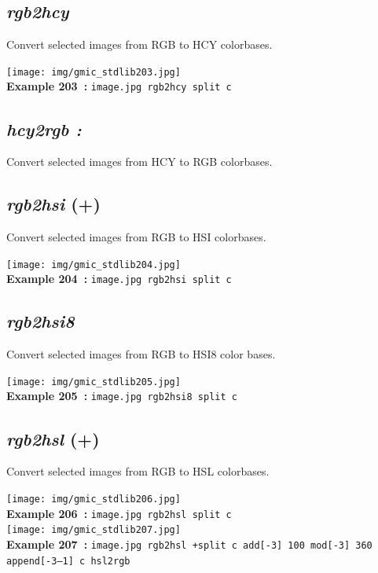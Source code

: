 \documentclass[a4paper,10.5pt,twoside]{book}
\begin{document}
\subsection{\emph{rgb2hcy} }\vspace*{-0.7em}
Convert selected images from RGB to HCY colorbases.
\begin{center}\texttt{[image: img/gmic\_stdlib203.jpg]}\\
{\footnotesize \textbf{Example 203~:} \texttt{image.jpg rgb2hcy split c}}
\end{center}

\subsection{\emph{hcy2rgb :} }\vspace*{-0.7em}
Convert selected images from HCY to RGB colorbases.


\subsection{\emph{rgb2hsi} (+)}\vspace*{-0.7em}
Convert selected images from RGB to HSI colorbases.
\begin{center}\texttt{[image: img/gmic\_stdlib204.jpg]}\\
{\footnotesize \textbf{Example 204~:} \texttt{image.jpg rgb2hsi split c}}
\end{center}

\subsection{\emph{rgb2hsi8} }\vspace*{-0.7em}
Convert selected images from RGB to HSI8 color bases.
\begin{center}\texttt{[image: img/gmic\_stdlib205.jpg]}\\
{\footnotesize \textbf{Example 205~:} \texttt{image.jpg rgb2hsi8 split c}}
\end{center}

\subsection{\emph{rgb2hsl} (+)}\vspace*{-0.7em}
Convert selected images from RGB to HSL colorbases.
\begin{center}\texttt{[image: img/gmic\_stdlib206.jpg]}\\
{\footnotesize \textbf{Example 206~:} \texttt{image.jpg rgb2hsl split c}}
\\\texttt{[image: img/gmic\_stdlib207.jpg]}\\
{\footnotesize \textbf{Example 207~:} \texttt{image.jpg rgb2hsl +split c add[-3] 100 mod[-3] 360 append[-3--1] c hsl2rgb}}
\end{center}
\end{document}
